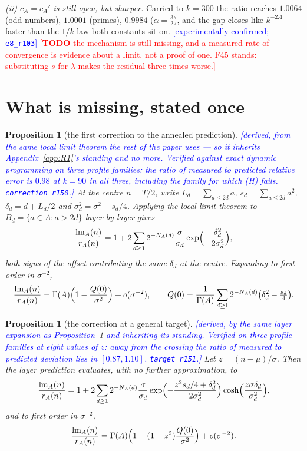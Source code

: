 \documentclass[11pt,a4paper]{article}
\theoremstyle{plain}
\newtheorem{proposition}[theorem]{Proposition}
\theoremstyle{definition}
\theoremstyle{remark}
\newcommand{\TODO}[1]{\textcolor{red}{[\textbf{TODO} #1]}}
\newcommand{\STATUS}[1]{\textcolor{blue}{\textsf{[#1]}}}
\begin{document}
\emph{(ii) $c_A=c_A'$ is still open, but sharper.} Carried to $k=300$ the ratio reaches
$1.0064$ (odd numbers), $1.0001$ (primes), $0.9984$ ($\alpha=\tfrac32$), and the gap closes
like $k^{-2.4}$ --- faster than the $1/k$ law both constants sit on.
\STATUS{experimentally confirmed; \texttt{e8\_r103}}
\TODO{the mechanism is still missing, and a measured rate of convergence is evidence about a
limit, not a proof of one. F45 stands: substituting $s$ for $\lambda$ makes the residual
three times worse.}

\section{What is missing, stated once}\label{sec:missing}

\begin{proposition}[the first correction to the annealed prediction]\label{prop:correction}
\STATUS{derived, from the same local limit theorem the rest of the paper uses --- so it inherits
Appendix~\ref{app:R1}'s standing and no more. Verified against exact dynamic programming on three
profile families: the ratio of measured to predicted relative error is $0.98$ at $k=90$ in all
three, including the family for which \textup{(H)} fails. \texttt{correction\_r150}.}
At the centre $n=T/2$, write $L_d=\sum_{a\le2d}a$, $s_d=\sum_{a\le2d}a^{2}$,
$\delta_d=d+L_d/2$ and $\sigma_d^{2}=\sigma^{2}-s_d/4$. Applying the local limit theorem to
$B_d=\{a\in A:a>2d\}$ layer by layer gives
\[
  \frac{\mathrm{lm}_A(n)}{r_A(n)}
  =1+2\sum_{d\ge1}2^{-N_A(d)}\frac{\sigma}{\sigma_d}
     \exp\Bigl(-\frac{\delta_d^{2}}{2\sigma_d^{2}}\Bigr),
\]
both signs of the offset contributing the same $\delta_d$ at the centre. Expanding to first order
in $\sigma^{-2}$,
\[
  \frac{\mathrm{lm}_A(n)}{r_A(n)}=\Gamma(A)\Bigl(1-\frac{Q(0)}{\sigma^{2}}\Bigr)+o(\sigma^{-2}),
  \qquad Q(0)=\frac1{\Gamma(A)}\sum_{d\ge1}2^{-N_A(d)}\bigl(\delta_d^{2}-\tfrac{s_d}{4}\bigr).
\]
\end{proposition}

\begin{proposition}[the correction at a general target]\label{prop:targetdep}
\STATUS{derived, by the same layer expansion as Proposition~\ref{prop:correction} and inheriting
its standing. Verified on three profile families at eight values of $z$: away from the crossing
the ratio of measured to predicted deviation lies in $[0.87,1.10]$. \texttt{target\_r151}.}
Let $z=(n-\mu)/\sigma$. Then \emph{the layer prediction evaluates, with no further
approximation, to}
\[
  \frac{\mathrm{lm}_A(n)}{r_A(n)}
  =1+2\sum_{d\ge1}2^{-N_A(d)}\frac{\sigma}{\sigma_d}
    \exp\Bigl(-\frac{z^{2}s_d/4+\delta_d^{2}}{2\sigma_d^{2}}\Bigr)
    \cosh\Bigl(\frac{z\sigma\delta_d}{\sigma_d^{2}}\Bigr),
\]
and to first order in $\sigma^{-2}$,
\[
  \frac{\mathrm{lm}_A(n)}{r_A(n)}
  =\Gamma(A)\Bigl(1-(1-z^{2})\frac{Q(0)}{\sigma^{2}}\Bigr)+o(\sigma^{-2}).
\]
\end{proposition}
\end{document}
